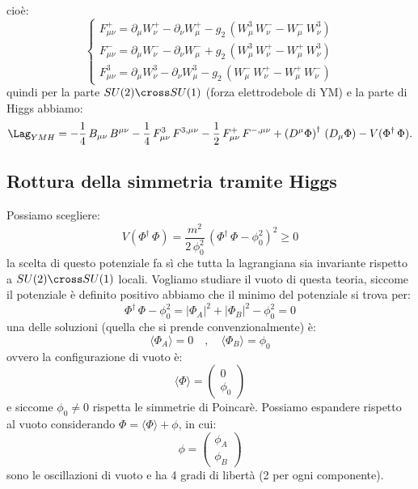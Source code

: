 cioè:
\begin{equation}
    \begin{cases}
        F_{\mu\nu}^+ = \partial_\mu W_\nu^+ - \partial_\nu W_\mu^+ - g_2\, \left( W_\mu^3\, W_\nu^- - W_\mu^-\, W_\nu^3 \right) \\
        F_{\mu\nu}^- = \partial_\mu W_\nu^- - \partial_\nu W_\mu^- + g_2\, \left( W_\mu^3\, W_\nu^+ - W_\mu^+\, W_\nu^3 \right) \\
        F_{\mu\nu}^3 = \partial_\mu W_\nu^3 - \partial_\nu W_\mu^3 - g_2\, \left( W_\mu^-\, W_\nu^+ - W_\mu^+\, W_\nu^- \right)
    \end{cases}
\end{equation}
quindi per la parte $SU(2)\cross SU(1)$ (forza elettrodebole di YM) e la parte di Higgs abbiamo:
\begin{equation}
    \Lag_{YMH} = -\frac{1}{4}\, B_{\mu\nu}\, B^{\mu\nu} - \frac{1}{4}\, F_{\mu\nu}^3\, F^{3,\mu\nu} - \frac{1}{2}\, F_{\mu\nu}^+\, F^{-,\mu\nu} + \left(D^\mu\Phi\right)^\dagger\, \left(D_\mu\Phi\right) - V(\Phi^\dagger\, \Phi).
\end{equation}


\subsection{Rottura della simmetria tramite Higgs}

Possiamo scegliere:
\begin{equation}
    V(\Phi^\dagger\, \Phi) = \frac{m^2}{2\, \phi_0^2}\, \left( \Phi^\dagger\, \Phi - \phi_0^2 \right)^2 \geq 0
\end{equation}
la scelta di questo potenziale fa sì che tutta la lagrangiana sia invariante rispetto a $SU(2) \cross SU(1)$ locali. Vogliamo studiare il vuoto di questa teoria, siccome il potenziale è definito positivo abbiamo che il minimo del potenziale si trova per:
\begin{equation}
    \Phi^\dagger\, \Phi - \phi_0^2 = |\Phi_A|^2 + |\Phi_B|^2 - \phi_0^2 = 0
\end{equation}
una delle soluzioni (quella che si prende convenzionalmente) è:
\begin{equation}
    \langle\Phi_A\rangle = 0 \quad , \quad \langle\Phi_B\rangle = \phi_0
\end{equation}
ovvero la configurazione di vuoto è:
\begin{equation}
    \langle\Phi\rangle = \begin{pmatrix}
        0 \\
        \phi_0
    \end{pmatrix}
\end{equation}
e siccome $\phi_0\neq 0$ rispetta le simmetrie di Poincarè. Possiamo espandere rispetto al vuoto considerando $\Phi = \langle\Phi\rangle + \phi$, in cui:
\begin{equation}
    \phi = \begin{pmatrix}
        \phi_A \\
        \phi_B
    \end{pmatrix}
\end{equation}
sono le oscillazioni di vuoto e ha 4 gradi di libertà (2 per ogni componente). \\

